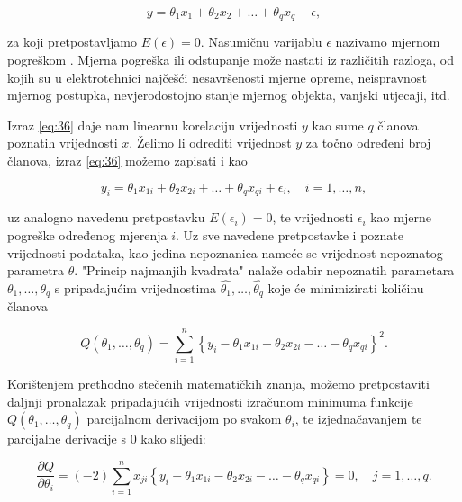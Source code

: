 \documentclass[a4paper,12pt,oneside]{memoir}
\begin{document}
                \begin{equation}
                    y=\theta_1x_1+\theta_2x_2+\ldots+\theta_qx_q+\epsilon,
                    \label{eq:37}
                \end{equation}

                za koji pretpostavljamo $E(\epsilon)=0$. Nasumičnu varijablu $\epsilon$ nazivamo mjernom pogreškom \cite{Priestley}. Mjerna pogreška ili odstupanje može nastati iz različitih razloga, od kojih su u elektrotehnici najčešći nesavršenosti mjerne opreme, neispravnost mjernog postupka, nevjerodostojno stanje mjernog objekta, vanjski utjecaji, itd.

                Izraz \eqref{eq:36} daje nam linearnu korelaciju vrijednosti $y$ kao sume $q$ članova poznatih vrijednosti $x$. Želimo li odrediti vrijednost $y$ za točno određeni broj članova, izraz \eqref{eq:36} možemo zapisati i kao
                
                \begin{equation}
                    y_i=\theta_1x_{1i}+\theta_2x_{2i}+\ldots+\theta_qx_{qi}+\epsilon_i, \quad i=1,\ldots,n,
                    \label{eq:38}
                \end{equation}
                
                uz analogno navedenu pretpostavku $E(\epsilon_i)=0$, te vrijednosti $\epsilon_i$ kao mjerne pogreške određenog mjerenja $i$. Uz sve navedene pretpostavke i poznate vrijednosti podataka, kao jedina nepoznanica nameće se vrijednost nepoznatog parametra $\theta$. "Princip najmanjih kvadrata" nalaže odabir nepoznatih parametara $\theta_1,\ldots,\theta_q$ s pripadajućim vrijednostima $\widehat{\theta_1},\ldots,\widehat{\theta_q}$ koje će minimizirati količinu članova \cite{Priestley}

                \begin{equation}
                    Q(\theta_1,\ldots,\theta_q)=\displaystyle\sum_{i=1}^{n}\left\{y_i-\theta_1x_{1i}-\theta_2x_{2i}-\ldots-\theta_qx_{qi}\right\}^2.
                    \label{eq:39}
                \end{equation}

                Korištenjem prethodno stečenih matematičkih znanja, možemo pretpostaviti daljnji pronalazak pripadajućih vrijednosti izračunom minimuma funkcije $Q(\theta_1,\ldots,\theta_q)$ parcijalnom derivacijom po svakom $\theta_i$, te izjednačavanjem te parcijalne derivacije s 0 kako slijedi:

                \begin{equation}
                    \frac{\partial Q}{\partial \theta_i}=(-2)\displaystyle\sum_{i=1}^{n}x_{ji}\left\{y_i-\theta_1x_{1i}-\theta_2x_{2i}-\ldots-\theta_qx_{qi}\right\}=0, \quad j=1,\ldots,q.
                    \label{eq:310}
                \end{equation}
\end{document}
